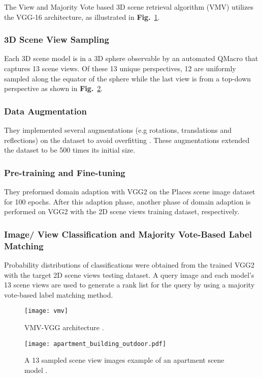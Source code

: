 \documentclass[../main.tex]{subfiles}
\begin{document}
	
The View and Majority Vote based 3D scene retrieval algorithm (VMV) utilizes the VGG-16 architecture, as illustrated in \textbf{Fig.}~\ref{SHREC19}. 

\subsubsection{3D Scene View Sampling}
Each 3D scene model is in a 3D sphere observable by an automated QMacro that captures 13 scene views. Of these 13 unique perspectives, 12 are uniformly sampled along the equator of the sphere while the last view is from a top-down perspective as shown in \textbf{Fig.}~\ref{apartment_building_outdoor}.


\subsubsection{Data Augmentation}
They implemented several augmentations (e.g rotations, 
translations and reflections) on the dataset to avoid overfitting 
\cite{3DICPR}. These augmentations extended the dataset to be 500 
times its initial size. 


\subsubsection{Pre-training and Fine-tuning}   
They preformed domain adaption with VGG2 on the Places scene image dataset \cite{zhou2017places} for 100 epochs. After this adaption phase, another phase of domain adaption is performed on VGG2 with the 2D scene views training dataset, respectively.

\subsubsection{Image/ View Classification and Majority Vote-Based Label Matching}
Probability distributions of classifications were obtained from the trained VGG2 with the target 2D scene views testing dataset. A query image and each model's 13 scene views are used to generate a rank list for the query by using a majority vote-based label matching method.

\begin{figure}[!htp]
\centering
{
\texttt{[image: vmv]}
}
\caption{VMV-VGG architecture \cite{MIPR}.}
\label{SHREC19}
\end{figure}

\begin{figure}[!htp]
\centering
{
\texttt{[image: apartment\_building\_outdoor.pdf]}
}
\caption{A 13 sampled scene view images example of an apartment scene model \cite{MIPR}.}
\label{apartment_building_outdoor}
\end{figure}
\end{document}
